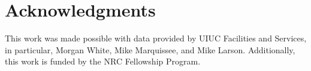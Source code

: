 \section{Acknowledgments}

This work was made possible with data provided by UIUC Facilities and Services, 
in particular, Morgan White, Mike Marquissee, and Mike Larson. Additionally, 
this work is funded by the NRC Fellowship Program. 